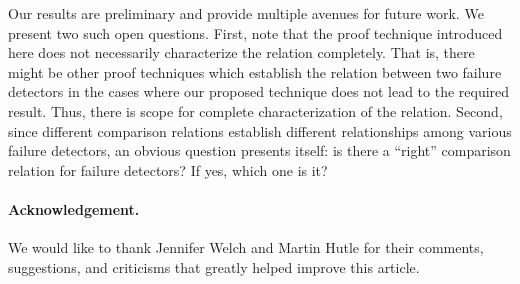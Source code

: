 \documentclass[11pt]{article}
\begin{document}
Our results are preliminary and provide multiple avenues for future
     work.
We present two such open questions.
First, note that the proof technique introduced here does not
     necessarily characterize the  relation completely.
That is, there might be other proof techniques which establish the
      relation between two failure detectors in the cases
     where our proposed technique does not lead to the required
     result.
Thus, there is scope for complete characterization of the 
     relation.
Second, since different comparison relations establish different
     relationships among various failure detectors, an obvious
     question presents itself: is there a ``right'' comparison
     relation for failure detectors? If yes, which one is it?

\paragraph{Acknowledgement.} We would like to thank Jennifer Welch and Martin Hutle for their comments, suggestions, and criticisms that greatly helped improve this article.


\end{document}
